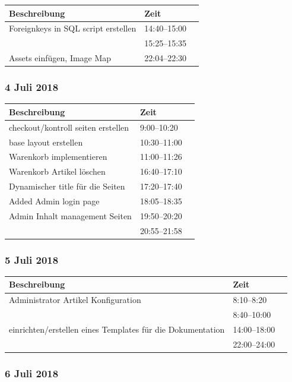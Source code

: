 \documentclass[a4paper, 11pt]{article}
\begin{document}
\begin{tabular}{llr}
\toprule
Beschreibung & Zeit \\
\midrule
Foreignkeys in SQL script erstellen & 14:40--15:00 \\
 & 15:25--15:35 \\
Assets einfügen, Image Map & 22:04--22:30 \\
\bottomrule
\end{tabular}

\subsubsection{4 Juli 2018}

\begin{tabular}{llr}
\toprule
Beschreibung & Zeit \\
\midrule
checkout/kontroll seiten erstellen & 9:00--10:20 \\
base layout erstellen & 10:30--11:00 \\
Warenkorb implementieren & 11:00--11:26 \\
Warenkorb Artikel löschen & 16:40--17:10 \\
Dynamischer title für die Seiten & 17:20--17:40 \\
Added Admin login page & 18:05--18:35 \\
Admin Inhalt management Seiten & 19:50--20:20 \\
 & 20:55--21:58 \\
\bottomrule
\end{tabular}

\subsubsection{5 Juli 2018}

\begin{tabular}{llr}
\toprule
Beschreibung & Zeit \\
\midrule
Administrator Artikel Konfiguration & 8:10--8:20 \\
 & 8:40--10:00 \\
einrichten/erstellen eines Templates für die Dokumentation & 14:00--18:00 \\
 & 22:00--24:00 \\
\bottomrule
\end{tabular}

\subsubsection{6 Juli 2018}
\end{document}
